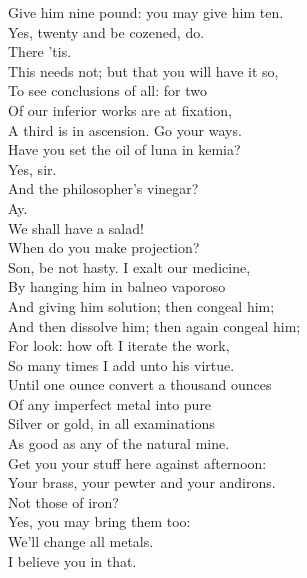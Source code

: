 \documentclass[a4paper,oneside,12pt]{memoir}
\begin{document}
\begin{drama*}
\subtlespeaks {} Give him nine pound: you may give him ten.\\
\surlyspeaks Yes, twenty and be cozened, do.\\
\mammonspeaks {} There 'tis.\\
\subtlespeaks This needs not; but that you will have it so,\\
To see conclusions of all: for two\\
Of our inferior works are at fixation,\\
A third is in ascension. Go your ways.\\
Have you set the oil of luna in kemia?\\
\facespeaks Yes, sir.\\
\subtlespeaks {} And the philosopher's vinegar?\\
\facespeaks {} Ay.\\
\surlyspeaks We shall have a salad!\\
\mammonspeaks {} When do you make projection?\\
\subtlespeaks Son, be not hasty. I exalt our medicine,\\
By hanging him in balneo vaporoso\\
And giving him solution; then congeal him;\\
And then dissolve him; then again congeal him;\\
For look: how oft I iterate the work,\\
So many times I add unto his virtue.\\
Until one ounce convert a thousand ounces\\
Of any imperfect metal into pure\\
Silver or gold, in all examinations\\
As good as any of the natural mine.\\
Get you your stuff here against afternoon:\\
Your brass, your pewter and your andirons.\\
\mammonspeaks Not those of iron?\\
\subtlespeaks {} Yes, you may bring them too:\\
We'll change all metals.\\
\surlyspeaks {} I believe you in that.\\

\end{drama*}
\end{document}
